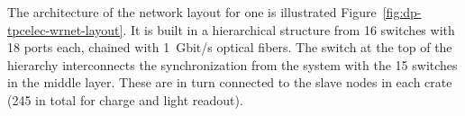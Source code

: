 The architecture of the  network layout for one  is illustrated Figure~\ref{fig:dp-tpcelec-wrnet-layout}. It is built in a hierarchical structure from \num{16}  switches with \num{18} ports each,  chained with \SI{1}{Gbit/s} optical fibers. The switch at the top of the hierarchy interconnects the synchronization %
 from the  system with the \num{15} switches in the middle layer. These are in turn connected to the  slave nodes in each  crate (\num{245} in total for charge and light readout). 


